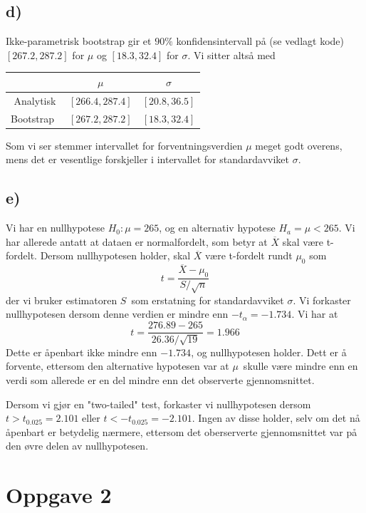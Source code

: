 \documentclass[12p,a4paper]{article}
\renewcommand{\bar}{\overline}
\begin{document}
\subsection*{d)}
Ikke-parametrisk bootstrap gir et $90\%$ konfidensintervall på (se vedlagt kode) $[267.2, 287.2]$ for $\mu$ og $[18.3, 32.4]$ for $\sigma$. Vi sitter altså med

\begin{tabular}{c|c|c}
              & $\mu$ & $\sigma$ \\ \hline
    Analytisk & $[266.4, 287.4]$  &  $[20.8, 36.5]$ \\
    Bootstrap & $[267.2, 287.2]$  &  $[18.3, 32.4]$
\end{tabular}

Som vi ser stemmer intervallet for forventningsverdien $\mu$ meget godt overens, mens det er vesentlige forskjeller i intervallet for standardavviket $\sigma$.



\subsection*{e)}
Vi har en nullhypotese $H_0: \mu = 265$, og en alternativ hypotese $H_a = \mu < 265$. Vi har allerede antatt at dataen er normalfordelt, som betyr at $\bar{X}$ skal være t-fordelt. Dersom nullhypotesen holder, skal $\bar{X}$ være t-fordelt rundt $\mu_0$ som
\begin{equation}
    t = \frac{\bar{X} - \mu_0}{S/\sqrt{n}}
\end{equation}
der vi bruker estimatoren $S$ som erstatning for standardavviket $\sigma$. Vi forkaster nullhypotesen dersom denne verdien er mindre enn $-t_{\alpha} = -  1.734$. Vi har at
\begin{equation}
    t = \frac{276.89 - 265}{26.36/\sqrt{19}} = 1.966
\end{equation}
Dette er åpenbart ikke mindre enn $-1.734$, og nullhypotesen holder. Dett er å forvente, ettersom den alternative hypotesen var at $\mu$ skulle være mindre enn en verdi som allerede er en del mindre enn det observerte gjennomsnittet.

Dersom vi gjør en "two-tailed" test, forkaster vi nullhypotesen dersom $t > t_{0.025} = 2.101$ eller $t < -t_{0.025} = -2.101$. Ingen av disse holder, selv om det nå åpenbart er betydelig nærmere, ettersom det oberserverte gjennomsnittet var på den øvre delen av nullhypotesen.


\section*{Oppgave 2}
\end{document}
